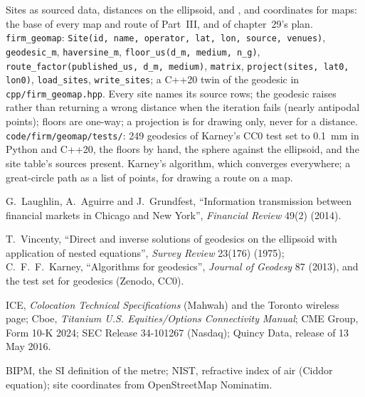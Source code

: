 \begin{build}
 Sites as sourced data, distances on the ellipsoid,  and , and coordinates for maps: the base of
every map and route of Part~III, and of chapter~29's plan.
 \texttt{firm\_geomap}: \texttt{Site(id, name, operator, lat, lon, source, venues)}, \texttt{geodesic\_m},
\texttt{haversine\_m}, \texttt{floor\_us(d\_m, medium, n\_g)}, \texttt{route\_factor(published\_us, d\_m, medium)}, \texttt{matrix},
\texttt{project(sites, lat0, lon0)}, \texttt{load\_sites}, \texttt{write\_sites}; a C++20 twin of the geodesic in \texttt{cpp/firm\_geomap.hpp}.
 Every site names its source rows; the geodesic raises rather than returning a wrong distance when the iteration fails (nearly
antipodal points); floors are one-way; a projection is for drawing only, never for a distance.
 \texttt{code/firm/geomap/tests/}: 249 geodesics of Karney's CC0 test set to \qty{0.1}{\milli\metre} in Python and
C++20, the floors by hand, the sphere against the ellipsoid, and the site table's sources present.
 Karney's algorithm, which converges everywhere; a great-circle path as a list of points, for drawing a route on a map.
\end{build}

\begin{omsources}
\item G.~Laughlin, A.~Aguirre and J.~Grundfest, ``Information transmission between financial markets in Chicago and New York'', \emph{Financial
Review} 49(2) (2014).
\item T.~Vincenty, ``Direct and inverse solutions of geodesics on the ellipsoid with application of nested equations'', \emph{Survey Review}
23(176) (1975); C.~F.~F.~Karney, ``Algorithms for geodesics'', \emph{Journal of Geodesy} 87 (2013), and the test set for geodesics (Zenodo, CC0).
\item ICE, \emph{Colocation Technical Specifications} (Mahwah) and the Toronto wireless page; Cboe, \emph{Titanium U.S. Equities/Options
Connectivity Manual}; CME Group, Form 10-K 2024; SEC Release 34-101267 (Nasdaq); Quincy Data, release of 13 May 2016.
\item BIPM, the SI definition of the metre; NIST, refractive index of air (Ciddor equation); site coordinates from OpenStreetMap Nominatim.
\end{omsources}

